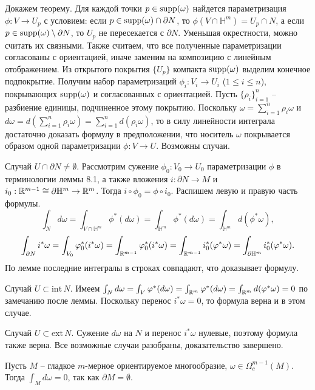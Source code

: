 \begin{myproof}
Докажем теорему.
Для каждой точки $p \in \operatorname{supp}(\omega)$ найдется параметризация $\phi: V \to U_p$ с условием: если $p \in \operatorname{supp}(\omega) \cap \partial N$, то $\phi(V \cap \mathbb{H}^m) = U_p \cap N$, а если $p \in \operatorname{supp}(\omega) \setminus \partial N$, то $U_p$ не пересекается с $\partial N$.
Уменьшая окрестности, можно считать их связными. Также считаем, что все полученные параметризации согласованы с ориентацией, иначе заменим на композицию с линейным отображением.
Из открытого покрытия $\{U_p\}$ компакта $\operatorname{supp}(\omega)$ выделим конечное подпокрытие.
Получим набор параметризаций $\phi_i: V_i \to U_i$ ($1 \leq i \leq n$), покрывающих $\operatorname{supp}(\omega)$ и согласованных с ориентацией.
Пусть $\{\rho_i\}_{i=1}^n$ -- разбиение единицы, подчиненное этому покрытию. Поскольку $\omega = \sum_{i=1}^n \rho_i \omega$ и $d\omega = d(\sum_{i=1}^n \rho_i \omega) = \sum_{i=1}^n d(\rho_i \omega)$,
то в силу линейности интеграла достаточно доказать формулу в предположении, что носитель $\omega$ покрывается образом одной параметризации $\phi: V \to U$. Возможны случаи.

\vspace{5pt}
Случай $U \cap \partial N \ne \emptyset$. Рассмотрим сужение $\phi_0: V_0 \to U_0$ параметризации $\phi$ в терминологии леммы 8.1, а также вложения $i: \partial N \to M$ и $i_0: \mathbb{R}^{m-1} \cong \partial \mathbb{H}^m \to \mathbb{R}^m$. 
Тогда $i \circ \phi_0 = \phi \circ i_0$. Распишем левую и правую часть формулы.
\[
\int_N d\omega = \int_{V \cap \mathbb{H}^m} \phi^*(d\omega) = \int_{\mathbb{H}^m} \phi^*(d\omega) = \int_{\mathbb{H}^m} d(\phi^*\omega),
\]
\[
\int_{\partial N} i^*\omega = \int_{V_0} \varphi_0^*(i^*\omega) = \int_{\mathbb{R}^{m-1}} \varphi_0^*(i^*\omega) = \int_{\mathbb{R}^{m-1}} i_0^*(\varphi^*\omega) = \int_{\partial \mathbb{H}^m} i_0^*(\varphi^*\omega).
\]
По лемме последние интегралы в строках совпадают, что доказывает формулу.

\vspace{5pt}
Случай $U \subset \text{int}\, N$. Имеем $\int_N d\omega = \int_V \varphi^*(d\omega) = \int_{\mathbb{R}^m} \varphi^*(d\omega) = \int_{\mathbb{R}^m} d(\varphi^*\omega) = 0$ по замечанию после леммы. 
Поскольку перенос $i^*\omega = 0$, то формула верна и в этом случае.

\vspace{5pt}
Случай $U \subset \text{ext}\, N$. Сужение $d \omega$ на $N$ и перенос $i^* \omega$ нулевые, поэтому формула также верна. Все возможные случаи разобраны, доказательство завершено.
\end{myproof}

\begin{corollary}
    Пусть $M$ -- гладкое $m$-мерное ориентируемое многообразие, $\omega \in \Omega_c^{m-1}(M)$. 
	Тогда $\int_M d\omega = 0$, так как $\partial M = \emptyset$.
\end{corollary}

